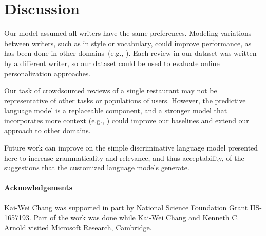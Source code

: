 \documentclass[11pt,letterpaper]{article}
\newcommand{\kw}[1]{\textcolor{red}{#1}}
\begin{document}

\section{Discussion}

Our model assumed all writers have the same preferences. Modeling variations between writers, such as in style or vocabulary, could improve performance, as has been done in other domains~(e.g., \citet{Lee:2017:PRL:3105672.3105673}). Each review in our dataset was written by a different writer, so our dataset could be used to evaluate online personalization approaches.

%
%
Our task of crowdsourced reviews of a single restaurant may not be representative of other tasks or populations of users. However, the predictive language model is a replaceable component, and a stronger model that incorporates more context (e.g., \citet{sordoni15conversation}) could improve our baselines and extend our approach to other domains. %
%
%
%
%

Future work can improve on the simple discriminative language model presented here to increase grammaticality and relevance, and thus acceptability, of the suggestions that the customized language models generate.


%

%

%
%

\paragraph{Acknowledgements}
Kai-Wei Chang was supported in part by National Science Foundation Grant IIS-1657193. Part of the work was done while Kai-Wei Chang and Kenneth C. Arnold visited Microsoft Research, Cambridge.
\end{document}
